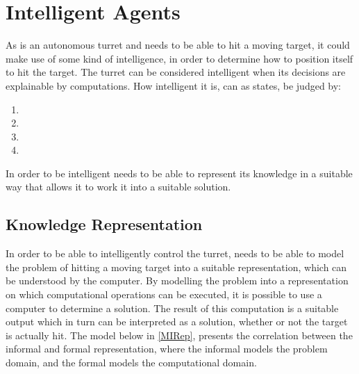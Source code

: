 \section{Intelligent Agents}
 
As \name is an autonomous turret and needs to be able to hit a moving target,
it could make use of some kind of intelligence, in order to determine how to
position itself to hit the target. The turret can be considered intelligent when
its decisions are explainable by computations. How intelligent it is, can as
\citep[ch.1.1,p.4]{MIBook} states, be judged by:

\begin{enumerate}
  \item {}
  \item {}
  \item {}
  \item {}
\end{enumerate}

In order to be intelligent \name needs to be able to represent its
knowledge in a suitable way that allows it to work it into a suitable solution. 

\subsection{Knowledge Representation}\label{KR}

In order to be able to intelligently control the turret, \name needs to be able
to model the problem of hitting a moving target into a suitable representation,
which can be understood by the computer. By modelling the problem into a
representation on which computational operations can be executed, it is possible
to use a computer to determine a solution. The result of this computation is a
suitable output which in turn can be interpreted as a solution, whether or not
the target is actually hit. The model below in \autoref{MIRep}, presents the
correlation between the informal and formal representation, where the informal
models the problem domain, and the formal models the computational domain.


